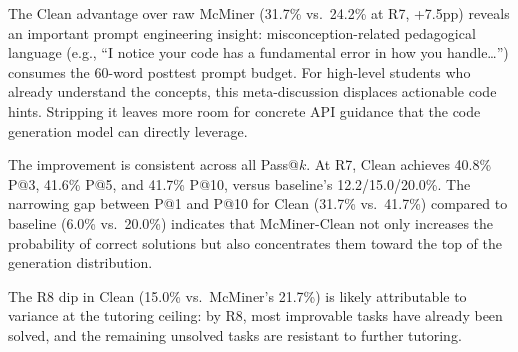 \documentclass[11pt]{article}
\begin{document}
The Clean advantage over raw McMiner (31.7\% vs.\ 24.2\% at R7, +7.5pp) reveals an important prompt engineering insight: misconception-related pedagogical language (e.g., ``I notice your code has a fundamental error in how you handle\ldots'') consumes the 60-word posttest prompt budget. For high-level students who already understand the concepts, this meta-discussion displaces actionable code hints. Stripping it leaves more room for concrete API guidance that the code generation model can directly leverage.

The improvement is consistent across all Pass@$k$. At R7, Clean achieves 40.8\% P@3, 41.6\% P@5, and 41.7\% P@10, versus baseline's 12.2/15.0/20.0\%. The narrowing gap between P@1 and P@10 for Clean (31.7\% vs.\ 41.7\%) compared to baseline (6.0\% vs.\ 20.0\%) indicates that McMiner-Clean not only increases the probability of correct solutions but also concentrates them toward the top of the generation distribution.

The R8 dip in Clean (15.0\% vs.\ McMiner's 21.7\%) is likely attributable to variance at the tutoring ceiling: by R8, most improvable tasks have already been solved, and the remaining unsolved tasks are resistant to further tutoring.
\end{document}
